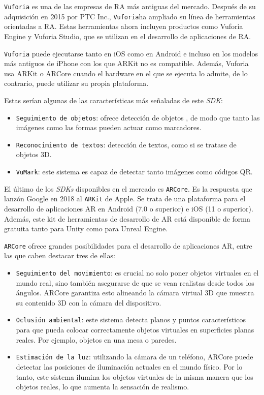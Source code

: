 \texttt{Vuforia} es una de las empresas de RA más antiguas del mercado. Después de su adquisición en 2015 por PTC Inc., \texttt{Vuforia}ha ampliado su línea de herramientas orientadas a RA. Estas herramientas ahora incluyen productos como Vuforia Engine y Vuforia Studio, que se utilizan en el desarrollo de aplicaciones de RA.

\texttt{Vuforia} puede ejecutarse tanto en iOS como en Android e incluso en los modelos más antiguos de iPhone con los que ARKit no es compatible. Además, Vuforia usa ARKit o ARCore cuando el hardware en el que se ejecuta lo admite, de lo contrario, puede utilizar su propia plataforma.

Estas serían algunas de las características más señaladas de este \textit{SDK}:

\begin{itemize}
    \item \texttt{Seguimiento de objetos}: ofrece detección de objetos , de modo que tanto las imágenes como las formas pueden actuar como marcadores.    
    \item \texttt{Reconocimiento de textos}: detección de textos, como si se tratase de objetos 3D.
    \item \texttt{VuMark}: este sistema es capaz de detectar tanto imágenes como códigos QR.
\end{itemize}

El último de los \textit{SDKs} disponibles en el mercado es \texttt{ARCore}. Es la respuesta que lanzón Google en 2018 al \texttt{ARKit} de Apple. Se trata de una plataforma para el desarrollo de aplicaciones AR en Android (7.0 o superior) e iOS (11 o superior). Además, este kit de herramientas de desarrollo de AR está disponible de forma gratuita tanto para Unity como para Unreal Engine.

\texttt{ARCore} ofrece grandes posibilidades para el desarrollo de aplicaciones AR, entre las que caben destacar tres de ellas:

\begin{itemize}
    \item \texttt{Seguimiento del movimiento}: es crucial no solo poner objetos virtuales en el mundo real, sino también asegurarse de que se vean realistas desde todos los ángulos. ARCore garantiza esto alineando la cámara virtual 3D que muestra su contenido 3D con la cámara del dispositivo.
    \item \texttt{Oclusión ambiental}: este sistema detecta planos y puntos característicos para que pueda colocar correctamente objetos virtuales en superficies planas reales. Por ejemplo, objetos en una mesa o paredes.
    \item \texttt{Estimación de la luz}: utilizando la cámara de un teléfono, ARCore puede detectar las posiciones de iluminación actuales en el mundo físico. Por lo tanto, este sistema ilumina los objetos virtuales de la misma manera que los objetos reales, lo que aumenta la sensación de realismo.
\end{itemize}

